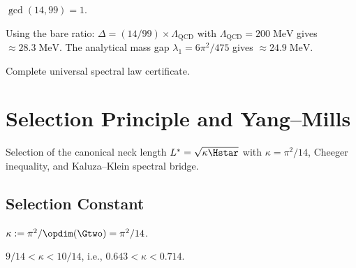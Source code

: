 \begin{theorem}\label{thm:ratio_irreducible}
    \leanok
    $\gcd(14, 99) = 1$.
\end{theorem}

\begin{theorem}\label{thm:physical_mass_gap}
    \leanok
    Using the bare ratio: $\Delta = (14/99) \times \Lambda_{\mathrm{QCD}}$
    with $\Lambda_{\mathrm{QCD}} = 200\;\mathrm{MeV}$ gives $\approx 28.3\;\mathrm{MeV}$.
    The analytical mass gap $\lambda_1 = 6\pi^2/475$ gives $\approx 24.9\;\mathrm{MeV}$.
\end{theorem}

\begin{theorem}\label{thm:universal_law_cert}
    \leanok
    Complete universal spectral law certificate.
\end{theorem}


\chapter{Selection Principle and Yang--Mills}\label{chap:selection}

Selection of the canonical neck length $L^* = \sqrt{\kappa \Hstar}$
with $\kappa = \pi^2/14$, Cheeger inequality, and Kaluza--Klein spectral bridge.

\section{Selection Constant}

\begin{definition}[$\kappa$]\label{def:kappa}
    \leanok
    $\kappa := \pi^2 / \opdim(\Gtwo) = \pi^2/14$.
\end{definition}

\begin{theorem}\label{thm:kappa_bounds}
    \leanok
    $9/14 < \kappa < 10/14$, i.e., $0.643 < \kappa < 0.714$.
\end{theorem}

